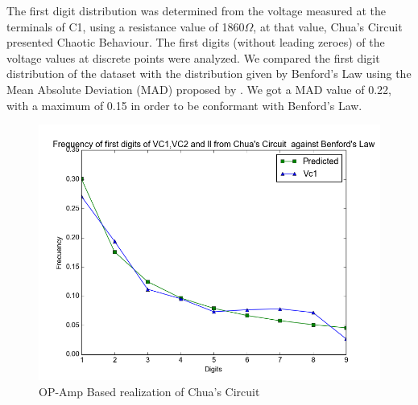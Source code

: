 \begin{itemize}
          The first digit distribution was determined from the voltage measured at the terminals of C1, using a resistance value of 1860$\Omega$, at that value, Chua's Circuit presented Chaotic Behaviour. The first digits (without leading zeroes) of the voltage values at discrete points were analyzed. We compared the first digit distribution of the dataset with the distribution given by Benford's Law using the Mean Absolute Deviation (MAD) proposed by \cite{Nigrini97}. We got a MAD value of 0.22, with a maximum of 0.15 in order to be conformant with Benford's Law.
            \begin{figure}[H]
            \centering
            \includegraphics[scale=0.5]{imagenes/2-benford/chua_benford.png}
            \caption{OP-Amp Based realization of Chua's Circuit}
            \end{figure}
 \end{itemize}

\newpage
